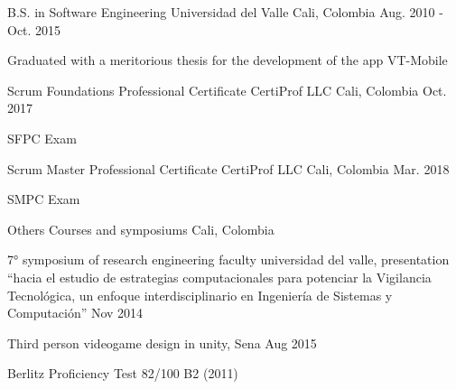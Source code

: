 

\begin{cventries}

  \cventry
    {B.S. in Software Engineering} %
    {Universidad del Valle} %
    {Cali, Colombia} %
    {Aug. 2010 - Oct. 2015} %
    {
      \begin{cvitems} %
        \item {Graduated with a meritorious thesis for the development of the app VT-Mobile}
      \end{cvitems}
    }


  \cventry
    {Scrum Foundations Professional Certificate} %
    {CertiProf LLC} %
    {Cali, Colombia} %
    { Oct. 2017} %
    {
      \begin{cvitems} %
        \item {SFPC Exam}
      \end{cvitems}
    }

\cventry
    {Scrum Master Professional Certificate} %
    {CertiProf LLC} %
    {Cali, Colombia} %
    { Mar. 2018} %
    {
      \begin{cvitems} %
        \item {SMPC Exam}
      \end{cvitems}
    }

 \cventry
    {Others} %
    {Courses and symposiums} %
    {Cali, Colombia} %
    {} %
    {
      \begin{cvitems} %
        \item {7° symposium of research engineering faculty universidad del valle, presentation “hacia el estudio de estrategias computacionales para potenciar la Vigilancia Tecnológica, un enfoque interdisciplinario en Ingeniería de Sistemas y Computación” Nov 2014}
        \item {Third person videogame design in unity, Sena Aug 2015}
        \item {Berlitz Proficiency Test 82/100  B2 (2011)}
      \end{cvitems}
    }

\end{cventries}
